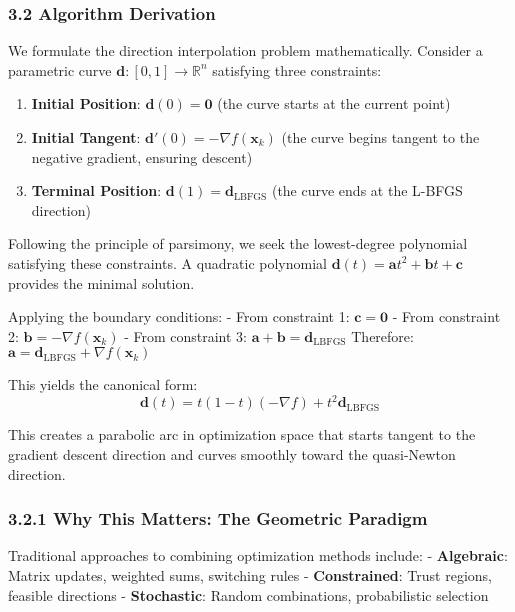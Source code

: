 \hypertarget{algorithm-derivation}{%
\subsubsection{3.2 Algorithm Derivation}\label{algorithm-derivation}}

We formulate the direction interpolation problem mathematically. Consider a parametric curve
\(\mathbf{d}: [0,1] \rightarrow \mathbb{R}^n\) satisfying three constraints:

\begin{enumerate}
\def\labelenumi{\arabic{enumi}.}
\item
  \textbf{Initial Position}: \(\mathbf{d}(0) = \mathbf{0}\) (the curve starts at the current point)
\item
  \textbf{Initial Tangent}: \(\mathbf{d}'(0) = -\nabla f(\mathbf{x}_k)\) (the curve begins tangent to the negative
  gradient, ensuring descent)
\item
  \textbf{Terminal Position}: \(\mathbf{d}(1) = \mathbf{d}_{\text{LBFGS}}\) (the curve ends at the L-BFGS direction)
\end{enumerate}

Following the principle of parsimony, we seek the lowest-degree polynomial satisfying these constraints. A quadratic
polynomial \(\mathbf{d}(t) = \mathbf{a}t^2 + \mathbf{b}t + \mathbf{c}\) provides the minimal solution.

Applying the boundary conditions:
- From constraint 1: \(\mathbf{c} = \mathbf{0}\)
- From constraint 2: \(\mathbf{b} = -\nabla f(\mathbf{x}_k)\)
- From constraint 3: \(\mathbf{a} + \mathbf{b} = \mathbf{d}_{\text{LBFGS}}\)
Therefore: \(\mathbf{a} = \mathbf{d}_{\text{LBFGS}} + \nabla f(\mathbf{x}_k)\)

This yields the canonical form:
\[\mathbf{d}(t) = t(1-t)(-\nabla f) + t^2 \mathbf{d}_{\text{LBFGS}}\]

This creates a parabolic arc in optimization space that starts tangent to the gradient descent direction and curves
smoothly toward the quasi-Newton direction.

\hypertarget{why-this-matters-the-geometric-paradigm}{%
\subsubsection{3.2.1 Why This Matters: The Geometric Paradigm}\label{why-this-matters-the-geometric-paradigm}}

Traditional approaches to combining optimization methods include:
- \textbf{Algebraic}: Matrix updates, weighted sums, switching rules
- \textbf{Constrained}: Trust regions, feasible directions
- \textbf{Stochastic}: Random combinations, probabilistic selection

